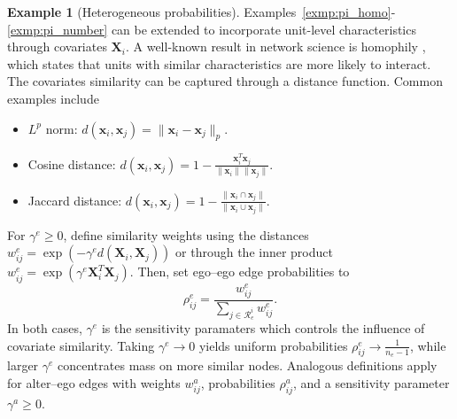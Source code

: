 \documentclass[11pt]{article}
\theoremstyle{definition}
\newtheorem{exmp}{Example}
\def \bX {\boldsymbol{X}}
\def \bx {\boldsymbol{x}}
\def \cR {\mathcal{R}}
\begin{document}
\begin{exmp}[Heterogeneous probabilities]
    \label{exmp:pi_hetero}
    Examples~\ref{exmp:pi_homo}-\ref{exmp:pi_number} can be extended to incorporate unit-level 
        characteristics through covariates $\bX_i$. 
    A well-known result in network science is homophily \citep{mcpherson2001homophily},
      which states that units with similar characteristics 
      are more likely to interact. 
    The covariates similarity can be captured through a distance function.
    Common examples include
    \begin{itemize}
        \item $L^p$ norm: $d(\bx_i,\bx_j)=\lVert\bx_i - \bx_j\rVert_p$.
        \item Cosine distance: $d(\bx_i,\bx_j)=1 - \frac{\bx_i^T\bx_j}{\lVert \bx_i \rVert \lVert \bx_j \rVert}$.
        \item Jaccard distance: $d(\bx_i,\bx_j)=1 - \frac{\lVert \bx_i \cap \bx_j \rVert}{\lVert \bx_i \cup \bx_j \rVert}$.
    \end{itemize}
    For $\gamma^e \geq 0$, define similarity weights using the distances    
    $w_{ij}^e = \exp \left(-\gamma^e d(\bX_i, \bX_j)\right)$ or 
    through the inner product $w_{ij}^e = \exp \left(\gamma^e \bX_i^T\bX_j\right)$.
    Then, set ego--ego edge probabilities to
    \begin{equation*}
     \rho^e_{ij}=\frac{w_{ij}^e}{\sum_{j \in \cR_e^i}w_{ij}^e}.
    \end{equation*}
    In both cases, $\gamma^e$ is the sensitivity paramaters
     which controls the influence of covariate similarity.
     Taking $\gamma^e \to 0$ yields uniform probabilities $\rho^e_{ij} \to\frac{1}{n_e-1}$,
      while larger $\gamma^e$ concentrates mass on more similar nodes.
       Analogous definitions apply for alter--ego edges with weights $w_{ij}^a$,
       probabilities $\rho^a_{ij}$, and a sensitivity parameter $\gamma^a \geq 0$.   
\end{exmp}
\end{document}
